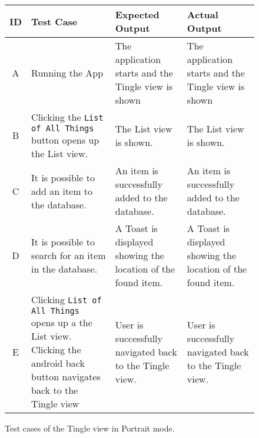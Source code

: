 \begin{figure}[H]
	\centering
	\renewcommand*{\arraystretch}{1.5} %
	\begin{tabular}{| c | p{3.5cm} | p{3.5cm} | p{3.5cm} |}
		\hline
		{\textbf{ID} } & {\textbf{Test Case} } & {\textbf{Expected Output}} & {\textbf {Actual Output}} \\\hline\hline
		A & Running the App & The application starts and the Tingle view is shown & The application starts and the Tingle view is shown  \\ \hline
		B &	Clicking the \texttt{List of All Things} button opens up the List view. & The List view is shown. & The List view is shown. \\ \hline
		C & It is possible to add an item to the database. & An item is successfully added to the database. & An item is successfully added to the database. \\ \hline
		D & It is possible to search for an item in the database. & A Toast is displayed showing the location of the found item. & A Toast is displayed showing the location of the found item. \\ \hline
		E & Clicking \texttt{List of All Things} opens up a the List view. 
     Clicking the android back button navigates back to the Tingle view & User is successfully navigated back to the Tingle view. & User is successfully navigated back to the Tingle view.  \\ \hline
	\end{tabular}
	
	\caption{Test cases of the Tingle view in Portrait mode.}
	\label{tab:test-cases-tingle-portrait}
\end{figure}

